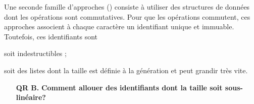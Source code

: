 \begin{itemize}
  Une seconde famille d'approches (\REF) consiste à utiliser des structures de
  données dont les opérations sont commutatives. Pour que les opérations
  commutent, ces approches associent à chaque caractère un identifiant unique et
  immuable. Toutefois, ces identifiants sont
  \begin{inparaenum}[(i)]
  \item soit indestructibles ;
  \item soit des listes dont la taille est définie à la génération et peut
    grandir très vite. 
  \end{inparaenum}

  \begin{itemize}
  \item [\textbf{QR B.}] \textbf{Comment allouer des identifiants dont la taille
      soit sous-linéaire?}
  \end{itemize}

\end{itemize}

